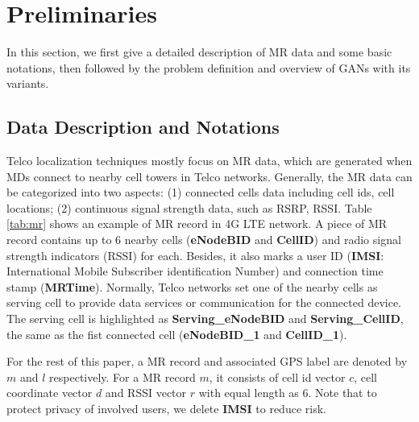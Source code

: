 \section{Preliminaries}
In this section, we first give a detailed description of MR data and some basic notations, then followed by the problem definition and overview of GANs \cite{DBLP:conf/nips/GoodfellowPMXWOCB14} with its variants.

\subsection{Data Description and Notations}
Telco localization techniques mostly focus on MR data, which are generated when MDs connect to nearby cell towers in Telco networks. Generally, the MR data can be categorized into two aspects: (1) connected cells data including cell ids, cell locations; (2) continuous signal strength data, such as RSRP, RSSI. Table \ref{tab:mr} shows an example of MR record in 4G LTE network. A piece of MR record contains up to 6 nearby cells (\textbf{eNodeBID} and \textbf{CellID}) and radio signal strength indicators (RSSI) for each. Besides, it also marks a user ID (\textbf{IMSI}: International Mobile Subscriber identification Number) and connection time stamp (\textbf{MRTime}). Normally, Telco networks set one of the nearby cells as serving cell to provide data services or communication for the connected device. The serving cell is highlighted as \textbf{Serving\_eNodeBID} and \textbf{Serving\_CellID}, the same as the fist connected cell (\textbf{eNodeBID\_1} and \textbf{CellID\_1}).

For the rest of this paper, a MR record and associated GPS label are denoted by $m$ and $l$ respectively. For a MR record $m$, it consists of cell id vector $c$, cell coordinate vector $d$ and RSSI vector $r$ with equal length as 6. Note that to protect privacy of involved users, we delete \textbf{IMSI} to reduce risk.

